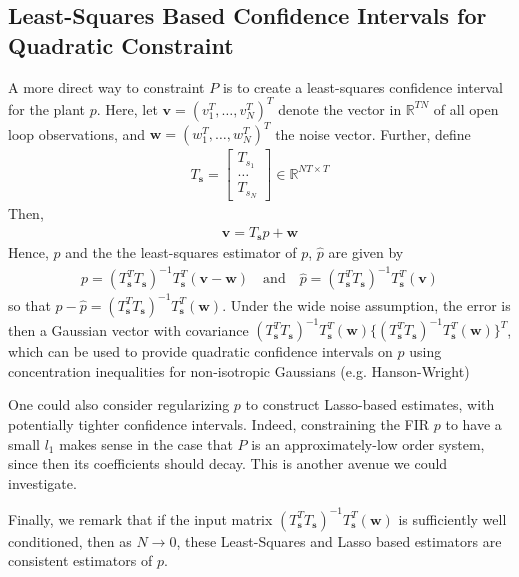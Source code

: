 \documentclass[11pt]{article} %
\newcommand{\R}{\mathbb{R}}
\theoremstyle{plain}
\theoremstyle{definition}
\theoremstyle{remark}
\begin{document}
\subsection{Least-Squares Based Confidence Intervals for Quadratic Constraint}
A more direct way to constraint $P$ is to create a least-squares confidence interval for the plant $p$. Here, let $\mathbf{v} = (v_1^T,\dots,v_N^T)^T$ denote the vector in $\R^{TN}$ of all open loop observations, and $\mathbf{w} = (w_1^T,\dots,w_N^T)^T$ the noise vector. Further, define
\begin{eqnarray}
T_{\mathbf{s}} = \begin{bmatrix} T_{s_1} \\
\dots\\
T_{s_N}
\end{bmatrix} \in \R^{NT \times T}
\end{eqnarray} 
Then,
\begin{eqnarray}
\mathbf{v} = T_{\mathbf{s}}p + \mathbf{w}
\end{eqnarray}
Hence, $p$ and the the least-squares estimator of $p$, $\widehat{p}$ are given by
\begin{eqnarray}
p = (T_{\mathbf{s}}^TT_{\mathbf{s}})^{-1}T_{\mathbf{s}}^T(\mathbf{v} - \mathbf{w}) \quad \text{and} \quad \widehat{p} = (T_{\mathbf{s}}^TT_{\mathbf{s}})^{-1}T_{\mathbf{s}}^T(\mathbf{v})
\end{eqnarray} 
so that $p - \widehat{p} = (T_{\mathbf{s}}^TT_{\mathbf{s}})^{-1}T_{\mathbf{s}}^T(\mathbf{w})$. Under the wide noise assumption, the error is then a Gaussian vector with covariance $(T_{\mathbf{s}}^TT_{\mathbf{s}})^{-1}T_{\mathbf{s}}^T(\mathbf{w}) \{(T_{\mathbf{s}}^TT_{\mathbf{s}})^{-1}T_{\mathbf{s}}^T(\mathbf{w})\}^T$, which can be used to provide quadratic confidence intervals on $p$ using concentration inequalities for non-isotropic Gaussians (e.g. Hanson-Wright\cite{rudelson2013hanson})

One could also consider regularizing $p$ to construct Lasso-based estimates, with potentially tighter confidence intervals. Indeed, constraining the FIR $p$ to have a small $l_1$ makes sense in the case that $P$ is an approximately-low order system, since then its coefficients should decay. This is another avenue we could investigate.

Finally, we remark that if the input matrix $(T_{\mathbf{s}}^TT_{\mathbf{s}})^{-1}T_{\mathbf{s}}^T(\mathbf{w})$ is sufficiently well conditioned, then as $N \to 0$, these Least-Squares and Lasso based estimators are consistent estimators of $p$. 
\end{document}
